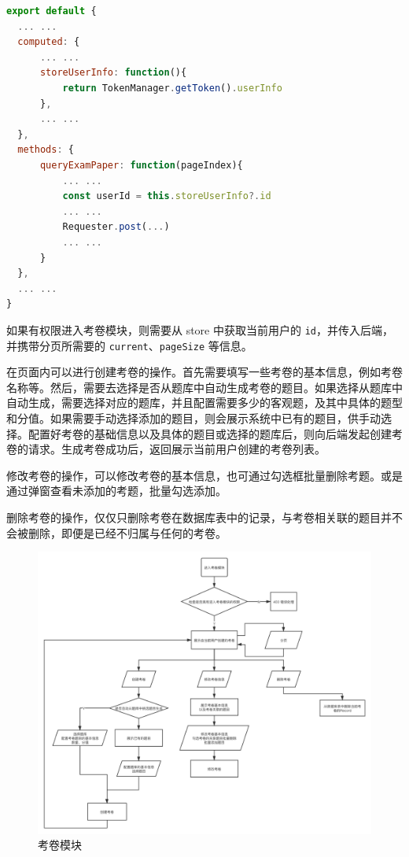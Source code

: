 \begin{lstlisting}[language=JavaScript]
export default {
  ... ...
  computed: {
      ... ...
      storeUserInfo: function(){
          return TokenManager.getToken().userInfo
      },
      ... ...
  },
  methods: {
      queryExamPaper: function(pageIndex){
          ... ...
          const userId = this.storeUserInfo?.id
          ... ...
          Requester.post(...)
          ... ...
      }
  },
  ... ...
}
\end{lstlisting}
如果有权限进入考卷模块，则需要从 store 中获取当前用户的 \lstinline!id!，并传入后端，并携带分页所需要的 \lstinline!current!、\lstinline!pageSize! 等信息。

在页面内可以进行创建考卷的操作。首先需要填写一些考卷的基本信息，例如考卷名称等。然后，需要去选择是否从题库中自动生成考卷的题目。如果选择从题库中自动生成，需要选择对应的题库，并且配置需要多少的客观题，及其中具体的题型和分值。如果需要手动选择添加的题目，则会展示系统中已有的题目，供手动选择。配置好考卷的基础信息以及具体的题目或选择的题库后，则向后端发起创建考卷的请求。生成考卷成功后，返回展示当前用户创建的考卷列表。

修改考卷的操作，可以修改考卷的基本信息，也可通过勾选框批量删除考题。或是通过弹窗查看未添加的考题，批量勾选添加。

删除考卷的操作，仅仅只删除考卷在数据库表中的记录，与考卷相关联的题目并不会被删除，即便是已经不归属与任何的考卷。
\begin{figure}[htb]
    \centering
    \includegraphics[width=\linewidth]{_images/考卷模块.png}
    \caption{考卷模块}
\end{figure}


